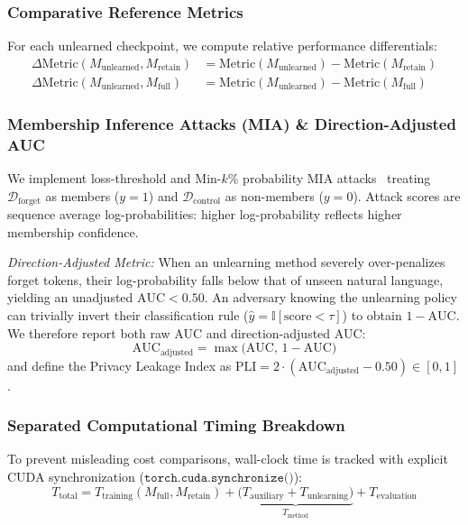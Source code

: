 \documentclass[11pt,a4paper]{article}
\begin{document}
\subsubsection{Comparative Reference Metrics}
For each unlearned checkpoint, we compute relative performance differentials:
\begin{align}
\Delta \text{Metric}(M_{\text{unlearned}}, M_{\text{retain}}) &= \text{Metric}(M_{\text{unlearned}}) - \text{Metric}(M_{\text{retain}}) \\
\Delta \text{Metric}(M_{\text{unlearned}}, M_{\text{full}}) &= \text{Metric}(M_{\text{unlearned}}) - \text{Metric}(M_{\text{full}})
\end{align}

\subsubsection{Membership Inference Attacks (MIA) \& Direction-Adjusted AUC}
We implement loss-threshold and Min-$k$\% probability MIA attacks~\cite{shi2024detecting} treating $\mathcal{D}_{\text{forget}}$ as members ($y=1$) and $\mathcal{D}_{\text{control}}$ as non-members ($y=0$). Attack scores are sequence average log-probabilities: higher log-probability reflects higher membership confidence.

\textit{Direction-Adjusted Metric:} When an unlearning method severely over-penalizes forget tokens, their log-probability falls below that of unseen natural language, yielding an unadjusted $\text{AUC} < 0.50$. An adversary knowing the unlearning policy can trivially invert their classification rule ($\hat{y} = \mathbb{I}[\text{score} < \tau]$) to obtain $1 - \text{AUC}$. We therefore report both raw AUC and direction-adjusted AUC:
\begin{equation}
\text{AUC}_{\text{adjusted}} = \max\Big(\text{AUC}, \, 1 - \text{AUC}\Big)
\end{equation}
and define the Privacy Leakage Index as $\text{PLI} = 2 \cdot (\text{AUC}_{\text{adjusted}} - 0.50) \in [0, 1]$.

\subsubsection{Separated Computational Timing Breakdown}
To prevent misleading cost comparisons, wall-clock time is tracked with explicit CUDA synchronization ($\texttt{torch.cuda.synchronize()}$):
\begin{equation}
T_{\text{total}} = T_{\text{training}}(M_{\text{full}}, M_{\text{retain}}) + \underbrace{\Big( T_{\text{auxiliary}} + T_{\text{unlearning}} \Big)}_{T_{\text{method}}} + T_{\text{evaluation}}
\end{equation}
\end{document}

